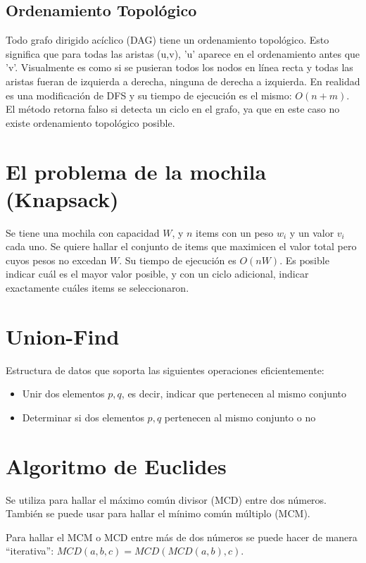 \documentclass{article}
\begin{document}
\begin{multicols}{2}
	\subsection{Ordenamiento Topológico}
	Todo grafo dirigido acíclico (DAG) tiene un ordenamiento topológico. Esto significa que para todas las aristas (u,v), 'u' aparece en el ordenamiento antes que 'v'. Visualmente es como si se pusieran todos los nodos en línea recta y todas las aristas fueran de izquierda a derecha, ninguna de derecha a izquierda. En realidad es una modificación de DFS y su tiempo de ejecución es el mismo: \( O(n + m) \). El método retorna falso si detecta un ciclo en el grafo, ya que en este caso no existe ordenamiento topológico posible.
	

\section{El problema de la mochila (Knapsack)}
Se tiene una mochila con capacidad \(W\), y \(n\) items con un peso \(w_i\) y un valor \(v_i\) cada uno. Se quiere hallar el conjunto de items que maximicen el valor total pero cuyos pesos no excedan \(W\). Su tiempo de ejecución es \( O(nW) \). Es posible indicar cuál es el mayor valor posible, y con un ciclo adicional, indicar exactamente cuáles items se seleccionaron.


\section{Union-Find}
Estructura de datos que soporta las siguientes operaciones eficientemente:
\begin{itemize}
\item Unir dos elementos \(p,q\), es decir, indicar que pertenecen al mismo conjunto
\item Determinar si dos elementos \(p,q\) pertenecen al mismo conjunto o no
\end{itemize}


\section{Algoritmo de Euclides}
Se utiliza para hallar el máximo común divisor (MCD) entre dos números. También se puede usar para hallar el mínimo común múltiplo (MCM).

Para hallar el MCM o MCD entre más de dos números se puede hacer de manera ``iterativa'': \( MCD(a, b, c) = MCD(MCD(a, b), c) \).



\end{multicols}
\end{document}
